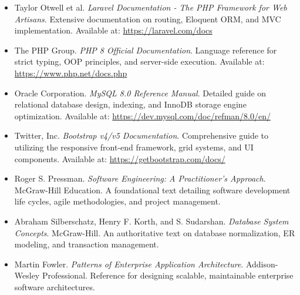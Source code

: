 ﻿\documentclass[12pt,a4paper]{report}
\begin{document}
\newpage
\begin{itemize}
\item Taylor Otwell et al. \textit{Laravel Documentation - The PHP Framework for Web Artisans}. Extensive documentation on routing, Eloquent ORM, and MVC implementation. Available at: \url{https://laravel.com/docs}
\item The PHP Group. \textit{PHP 8 Official Documentation}. Language reference for strict typing, OOP principles, and server-side execution. Available at: \url{https://www.php.net/docs.php}
\item Oracle Corporation. \textit{MySQL 8.0 Reference Manual}. Detailed guide on relational database design, indexing, and InnoDB storage engine optimization. Available at: \url{https://dev.mysql.com/doc/refman/8.0/en/}
\item Twitter, Inc. \textit{Bootstrap v4/v5 Documentation}. Comprehensive guide to utilizing the responsive front-end framework, grid systems, and UI components. Available at: \url{https://getbootstrap.com/docs/}
\item Roger S. Pressman. \textit{Software Engineering: A Practitioner's Approach}. McGraw-Hill Education. A foundational text detailing software development life cycles, agile methodologies, and project management.
\item Abraham Silberschatz, Henry F. Korth, and S. Sudarshan. \textit{Database System Concepts}. McGraw-Hill. An authoritative text on database normalization, ER modeling, and transaction management.
\item Martin Fowler. \textit{Patterns of Enterprise Application Architecture}. Addison-Wesley Professional. Reference for designing scalable, maintainable enterprise software architectures.
\end{itemize}
\end{document}
